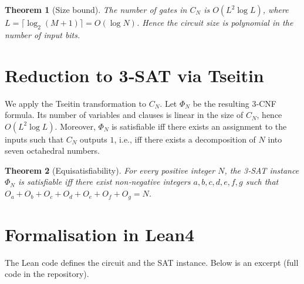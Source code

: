 \documentclass[11pt,a4paper]{article}
\newtheorem{theorem}{Theorem}[section]
\begin{document}
\begin{theorem}[Size bound]
The number of gates in \(C_N\) is \(O(L^2 \log L)\), where \(L = \lceil \log_2(M+1)\rceil = O(\log N)\). Hence the circuit size is polynomial in the number of input bits.
\end{theorem}

\section{Reduction to 3‑SAT via Tseitin}

We apply the Tseitin transformation to \(C_N\). Let \(\Phi_N\) be the resulting 3‑CNF formula. Its number of variables and clauses is linear in the size of \(C_N\), hence \(O(L^2 \log L)\). Moreover, \(\Phi_N\) is satisfiable iff there exists an assignment to the inputs such that \(C_N\) outputs \(1\), i.e., iff there exists a decomposition of \(N\) into seven octahedral numbers.

\begin{theorem}[Equisatisfiability]
For every positive integer \(N\), the 3‑SAT instance \(\Phi_N\) is satisfiable iff there exist non‑negative integers \(a,b,c,d,e,f,g\) such that \(O_a+O_b+O_c+O_d+O_e+O_f+O_g = N\).
\end{theorem}

\section{Formalisation in Lean4}

The Lean code defines the circuit and the SAT instance. Below is an excerpt (full code in the repository).
\end{document}
